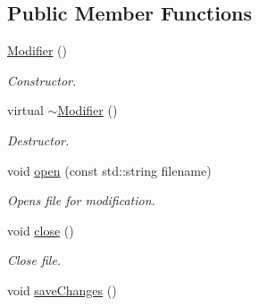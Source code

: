 \subsection*{Public Member Functions}
\begin{DoxyCompactItemize}
\item 
\hypertarget{classgdf_1_1_modifier_a6fe073392dcedae9fbdd084708afb1be}{
\hyperlink{classgdf_1_1_modifier_a6fe073392dcedae9fbdd084708afb1be}{Modifier} ()}
\label{classgdf_1_1_modifier_a6fe073392dcedae9fbdd084708afb1be}

\begin{DoxyCompactList}\small\item\em Constructor. \item\end{DoxyCompactList}\item 
\hypertarget{classgdf_1_1_modifier_a4def55c87a3bb26c3a51c59d76cca155}{
virtual \hyperlink{classgdf_1_1_modifier_a4def55c87a3bb26c3a51c59d76cca155}{$\sim$Modifier} ()}
\label{classgdf_1_1_modifier_a4def55c87a3bb26c3a51c59d76cca155}

\begin{DoxyCompactList}\small\item\em Destructor. \item\end{DoxyCompactList}\item 
\hypertarget{classgdf_1_1_modifier_abcb4c7bfa55babf4d1cc82b916877eda}{
void \hyperlink{classgdf_1_1_modifier_abcb4c7bfa55babf4d1cc82b916877eda}{open} (const std::string filename)}
\label{classgdf_1_1_modifier_abcb4c7bfa55babf4d1cc82b916877eda}

\begin{DoxyCompactList}\small\item\em Opens file for modification. \item\end{DoxyCompactList}\item 
\hypertarget{classgdf_1_1_modifier_a11862cf81de237520bf969f2755a1a08}{
void \hyperlink{classgdf_1_1_modifier_a11862cf81de237520bf969f2755a1a08}{close} ()}
\label{classgdf_1_1_modifier_a11862cf81de237520bf969f2755a1a08}

\begin{DoxyCompactList}\small\item\em Close file. \item\end{DoxyCompactList}\item 
\hypertarget{classgdf_1_1_modifier_a88b582ab5f78daf05796c89397523f5b}{
void \hyperlink{classgdf_1_1_modifier_a88b582ab5f78daf05796c89397523f5b}{saveChanges} ()}
\label{classgdf_1_1_modifier_a88b582ab5f78daf05796c89397523f5b}


\end{DoxyCompactItemize}
